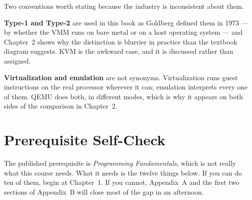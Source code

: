 \begin{conceptbox}
Two conventions worth stating because the industry is inconsistent about them.

\smallskip
\textbf{Type-1 and Type-2} are used in this book as Goldberg defined them in
1973 --- by whether the VMM runs on bare metal or on a host operating system ---
and Chapter~2 shows why the distinction is blurrier in practice than the
textbook diagram suggests. KVM is the awkward case, and it is discussed rather
than assigned.

\smallskip
\textbf{Virtualization and emulation} are not synonyms. Virtualization runs
guest instructions on the real processor wherever it can; emulation interprets
every one of them. QEMU does both, in different modes, which is why it appears
on both sides of the comparison in Chapter~2.
\end{conceptbox}

\newpage

\chapter*{Prerequisite Self-Check}

The published prerequisite is \emph{Programming Fundamentals}, which is not
really what this course needs. What it needs is the twelve things below. If you
can do ten of them, begin at Chapter~1. If you cannot, Appendix~A and the first
two sections of Appendix~B will close most of the gap in an afternoon.

